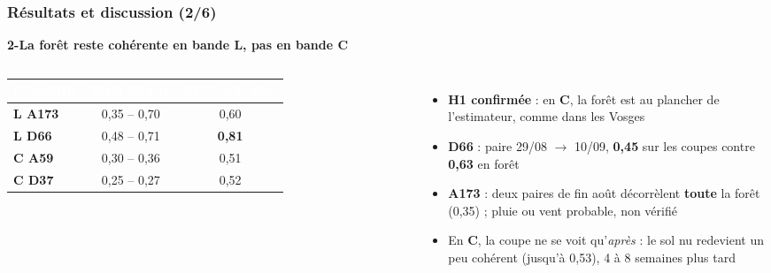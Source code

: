 \documentclass[aspectratio=169]{beamer}
\newcommand{\Lb}[1]{\textcolor{Lband}{\textbf{#1}}}
\newcommand{\Cb}[1]{\textcolor{Cband}{\textbf{#1}}}
\newcommand{\slidesubtitle}[1]{%
	\textcolor{myblue}{\small\textbf{#1}}%
	\par\vspace{3pt}%
}
\begin{document}
\begin{frame}{\phantom{x}}
	\frametitle{Résultats et discussion (2/6)}
	\slidesubtitle{2-La forêt reste cohérente en bande L, pas en bande C}
	\begin{columns}[c]
		\centering\scriptsize
		\renewcommand{\arraystretch}{1.25}
		\begin{tabular}{|l|c|c|}
			\hline
			\rowcolor{myblue}\textcolor{white}{\textbf{Géométrie}} & \textcolor{white}{\textbf{Forêt intacte}} &
			\textcolor{white}{\textbf{AUC coh. min.}} \\
			\hline
			\Lb{L A173} & 0,35 -- 0,70 & 0,60 \\
			\Lb{L D66} & 0,48 -- 0,71 & \textbf{0,81} \\
			\Cb{C A59} & 0,30 -- 0,36 & 0,51 \\
			\Cb{C D37} & 0,25 -- 0,27 & 0,52 \\
			\hline
		\end{tabular}

		\footnotesize
		\begin{itemize}
			\setlength{\itemsep}{4pt}
			\item \textbf{H1 confirmée} : en \Cb{C}, la forêt est au plancher de l'estimateur, comme dans les Vosges
			\item \Lb{D66} : paire 29/08 $\to$ 10/09, \textbf{0,45} sur les coupes contre \textbf{0,63} en forêt
			\item \Lb{A173} : deux paires de fin août décorrèlent \textbf{toute} la forêt (0,35) ; pluie ou vent
			probable, non vérifié
			\item En \Cb{C}, la coupe ne se voit qu'\emph{après} : le sol nu redevient un peu cohérent (jusqu'à 0,53),
			4 à 8 semaines plus tard
		\end{itemize}
	\end{columns}
\end{frame}
\end{document}
